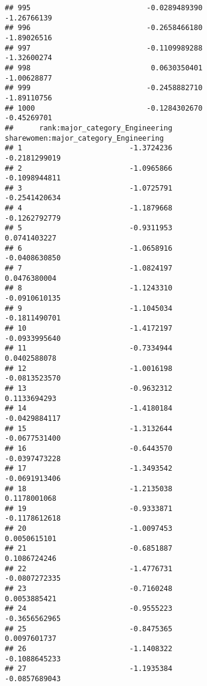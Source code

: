 \documentclass[
]{article}
\begin{document}
\begin{verbatim}
## 995                           -0.0289489390                -1.26766139
## 996                           -0.2658466180                -1.89026516
## 997                           -0.1109989288                -1.32600274
## 998                            0.0630350401                -1.00628877
## 999                           -0.2458882710                -1.89110756
## 1000                          -0.1284302670                -0.45269701
##      rank:major_category_Engineering sharewomen:major_category_Engineering
## 1                         -1.3724236                         -0.2181299019
## 2                         -1.0965866                         -0.1098944811
## 3                         -1.0725791                         -0.2541420634
## 4                         -1.1879668                         -0.1262792779
## 5                         -0.9311953                          0.0741403227
## 6                         -1.0658916                         -0.0408630850
## 7                         -1.0824197                          0.0476380004
## 8                         -1.1243310                         -0.0910610135
## 9                         -1.1045034                         -0.1811490701
## 10                        -1.4172197                         -0.0933995640
## 11                        -0.7334944                          0.0402588078
## 12                        -1.0016198                         -0.0813523570
## 13                        -0.9632312                          0.1133694293
## 14                        -1.4180184                         -0.0429884117
## 15                        -1.3132644                         -0.0677531400
## 16                        -0.6443570                         -0.0397473228
## 17                        -1.3493542                         -0.0691913406
## 18                        -1.2135038                          0.1178001068
## 19                        -0.9333871                         -0.1178612618
## 20                        -1.0097453                          0.0050615101
## 21                        -0.6851887                          0.1086724246
## 22                        -1.4776731                         -0.0807272335
## 23                        -0.7160248                          0.0053885421
## 24                        -0.9555223                         -0.3656562965
## 25                        -0.8475365                          0.0097601737
## 26                        -1.1408322                         -0.1088645233
## 27                        -1.1935384                         -0.0857689043

\end{verbatim}
\end{document}
